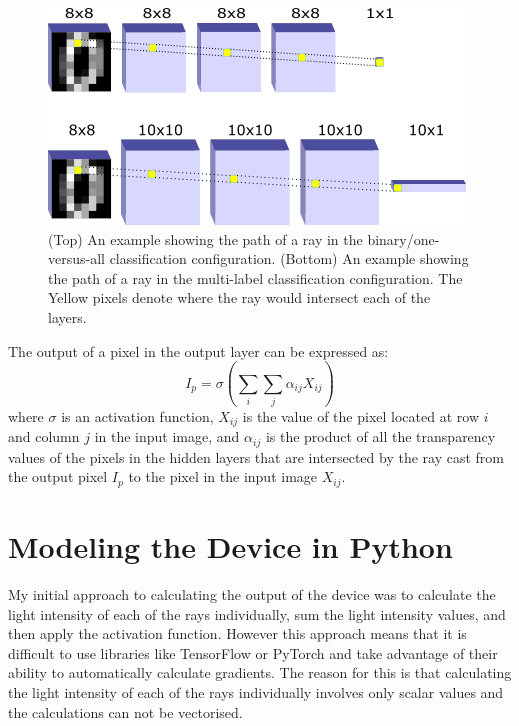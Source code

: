 \documentclass[]{article}
\begin{document}
\begin{figure}
	\centering
	\includegraphics{../images/device_schematic}
	\caption{(Top) An example showing the path of a ray in the binary/one-versus-all classification configuration. (Bottom) An example showing the path of a ray in the multi-label classification configuration. The Yellow pixels denote where the ray would intersect each of the layers.
	}
\end{figure}

The output of a pixel in the output layer can be expressed as: 
$$I_p=\sigma(\sum_{i}\sum_{j}\alpha_{ij}X_{ij})$$
where $\sigma$ is an activation function, $X_{ij}$ is the value of the pixel located at row $i$ and column $j$ in the input image, and $\alpha_{ij}$ is the product of all the transparency values of the pixels in the hidden layers that are intersected by the ray cast from the output pixel $I_p$ to the pixel in the input image $X_{ij}$.

\section{Modeling the Device in Python}
My initial approach to calculating the output of the device was to calculate the light intensity of each of the rays individually, sum the light intensity values, and then apply the activation function. However this approach means that it is difficult to use libraries like TensorFlow or PyTorch and take advantage of their ability to automatically calculate gradients. The reason for this is that calculating the light intensity of each of the rays individually involves only scalar values and the calculations can not be vectorised.
\end{document}
